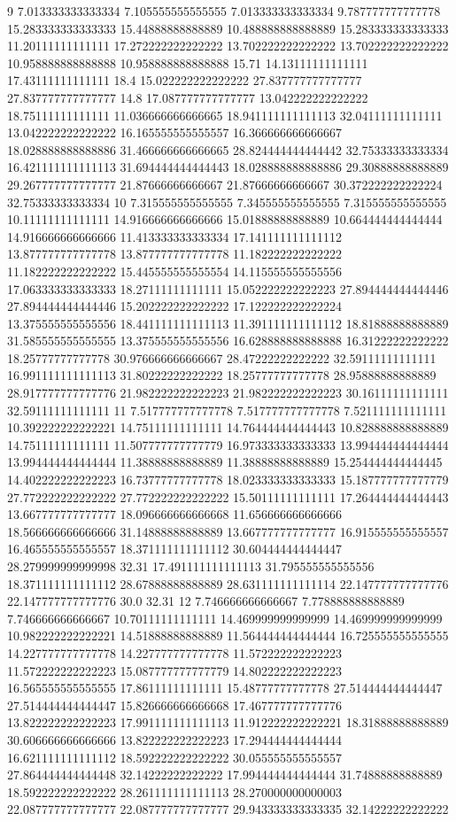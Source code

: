 9 7.013333333333334 7.105555555555555 7.013333333333334 9.787777777777778 15.283333333333333 15.44888888888889 10.488888888888889 15.283333333333333 11.20111111111111 17.272222222222222 13.702222222222222 13.702222222222222 10.958888888888888 10.958888888888888 15.71 14.13111111111111 17.43111111111111 18.4 15.022222222222222 27.837777777777777 27.837777777777777 14.8 17.087777777777777 13.042222222222222 18.75111111111111 11.036666666666665 18.941111111111113 32.04111111111111 13.042222222222222 16.165555555555557 16.366666666666667 18.028888888888886 31.466666666666665 28.824444444444442 32.75333333333334 16.421111111111113 31.694444444444443 18.028888888888886 29.30888888888889 29.267777777777777 21.87666666666667 21.87666666666667 30.372222222222224 32.75333333333334
10 7.315555555555555 7.345555555555555 7.315555555555555 10.11111111111111 14.916666666666666 15.01888888888889 10.664444444444444 14.916666666666666 11.413333333333334 17.141111111111112 13.877777777777778 13.877777777777778 11.182222222222222 11.182222222222222 15.445555555555554 14.115555555555556 17.063333333333333 18.27111111111111 15.052222222222223 27.894444444444446 27.894444444444446 15.202222222222222 17.122222222222224 13.375555555555556 18.441111111111113 11.391111111111112 18.81888888888889 31.585555555555555 13.375555555555556 16.628888888888888 16.31222222222222 18.25777777777778 30.976666666666667 28.47222222222222 32.59111111111111 16.991111111111113 31.80222222222222 18.25777777777778 28.95888888888889 28.917777777777776 21.982222222222223 21.982222222222223 30.16111111111111 32.59111111111111
11 7.517777777777778 7.517777777777778 7.521111111111111 10.392222222222221 14.75111111111111 14.764444444444443 10.828888888888889 14.75111111111111 11.507777777777779 16.973333333333333 13.994444444444444 13.994444444444444 11.38888888888889 11.38888888888889 15.254444444444445 14.402222222222223 16.73777777777778 18.023333333333333 15.187777777777779 27.772222222222222 27.772222222222222 15.50111111111111 17.264444444444443 13.667777777777777 18.096666666666668 11.656666666666666 18.566666666666666 31.14888888888889 13.667777777777777 16.915555555555557 16.465555555555557 18.371111111111112 30.604444444444447 28.279999999999998 32.31 17.491111111111113 31.795555555555556 18.371111111111112 28.67888888888889 28.631111111111114 22.147777777777776 22.147777777777776 30.0 32.31
12 7.746666666666667 7.778888888888889 7.746666666666667 10.70111111111111 14.469999999999999 14.469999999999999 10.982222222222221 14.51888888888889 11.564444444444444 16.725555555555555 14.227777777777778 14.227777777777778 11.572222222222223 11.572222222222223 15.087777777777779 14.802222222222223 16.565555555555555 17.86111111111111 15.48777777777778 27.514444444444447 27.514444444444447 15.826666666666668 17.467777777777776 13.822222222222223 17.991111111111113 11.912222222222221 18.31888888888889 30.606666666666666 13.822222222222223 17.294444444444444 16.621111111111112 18.592222222222222 30.055555555555557 27.864444444444448 32.14222222222222 17.994444444444444 31.74888888888889 18.592222222222222 28.261111111111113 28.270000000000003 22.087777777777777 22.087777777777777 29.943333333333335 32.14222222222222
